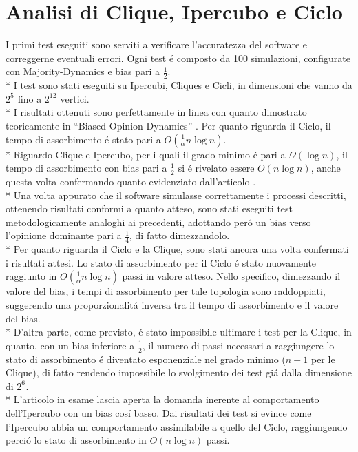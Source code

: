 \documentclass[../Tesi.tex]{subfiles}
\begin{document}
\section{Analisi di Clique, Ipercubo e Ciclo}
I primi test eseguiti sono serviti a verificare l'accuratezza del software e correggerne eventuali errori. Ogni test \'e composto da 100 simulazioni, configurate con Majority-Dynamics e bias pari a $\frac{1}{2}$.\\*
I test sono stati eseguiti su Ipercubi, Cliques e Cicli, in dimensioni che vanno da $2^{5^{\mathrm{}}}$ fino a $2^{12^{\mathrm{}}}$ vertici.\\*
I risultati ottenuti sono perfettamente in linea con quanto dimostrato teoricamente in ``Biased Opinion Dynamics'' \cite{DBLP:journals/corr/abs-2008-13589}. Per quanto riguarda il Ciclo, il tempo di assorbimento \'e stato pari a $O(\frac{1}{\alpha}n\log{}n)$. \\*
Riguardo Clique e Ipercubo, per i quali il grado minimo \'e pari a $\Omega(\log{}n)$, il tempo di assorbimento con bias pari a $\frac{1}{2}$ si \'e rivelato essere $O(n\log{}n)$, anche questa volta confermando quanto evidenziato dall'articolo \cite{DBLP:journals/corr/abs-2008-13589}.\\*
Una volta appurato che il software simulasse correttamente i processi descritti, ottenendo risultati conformi a quanto atteso, sono stati eseguiti test metodologicamente analoghi ai precedenti, adottando per\'o un bias verso l'opinione dominante pari a $\frac{1}{4}$, di fatto dimezzandolo.\\*
Per quanto riguarda il Ciclo e la Clique, sono stati ancora una volta confermati i risultati attesi.
Lo stato di assorbimento per il Ciclo \'e stato nuovamente raggiunto in $O(\frac{1}{\alpha}n\log{}n)$ passi in valore atteso. Nello specifico, dimezzando il valore del bias, i tempi di assorbimento per tale topologia sono raddoppiati, suggerendo una proporzionalit\'a inversa tra il tempo di assorbimento e il valore del bias.\\*
D'altra parte, come previsto, \'e stato impossibile ultimare i test per la Clique, in quanto, con un bias inferiore a $\frac{1}{2}$, il numero di passi necessari a raggiungere lo stato di assorbimento \'e diventato esponenziale nel grado minimo ($n-1$ per le Clique), di fatto rendendo impossibile lo svolgimento dei test gi\'a dalla dimensione di $2^{6^{\mathrm{}}}$.\\*
L'articolo in esame \cite{DBLP:journals/corr/abs-2008-13589} lascia aperta la domanda inerente al comportamento dell'Ipercubo con un bias cos\'i basso. Dai risultati dei test si evince come l'Ipercubo abbia un comportamento assimilabile a quello del Ciclo, raggiungendo perci\'o lo stato di assorbimento in $O(n\log{}n)$ passi.
\end{document}
